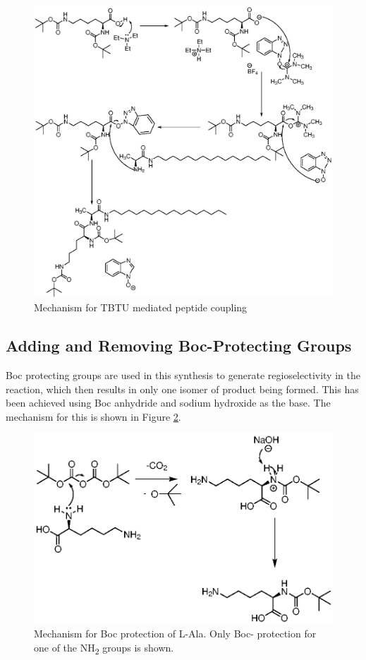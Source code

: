 \begin{figure}[ht!]
\centering
\includegraphics[scale=0.9]{Figures/TBTU_mechanism.eps}
\caption{Mechanism for TBTU mediated peptide coupling}
\label{TBTU mechanism}
\end{figure}
\newpage
\subsection{Adding and Removing Boc-Protecting Groups}
Boc protecting groups are used in this synthesis to generate regioselectivity in the reaction, which then results in only one isomer of product being formed. This has been achieved using Boc anhydride and sodium hydroxide as the base. The mechanism for this is shown in Figure \ref{Boc_protection}. 
\begin{figure}[ht!]
\centering
\includegraphics[scale=1]{Figures/Boc_protection.eps}
\caption{Mechanism for Boc protection of L-Ala. Only Boc- protection for one of the NH\textsubscript{2} groups is shown.}
\label{Boc_protection}
\end{figure}

